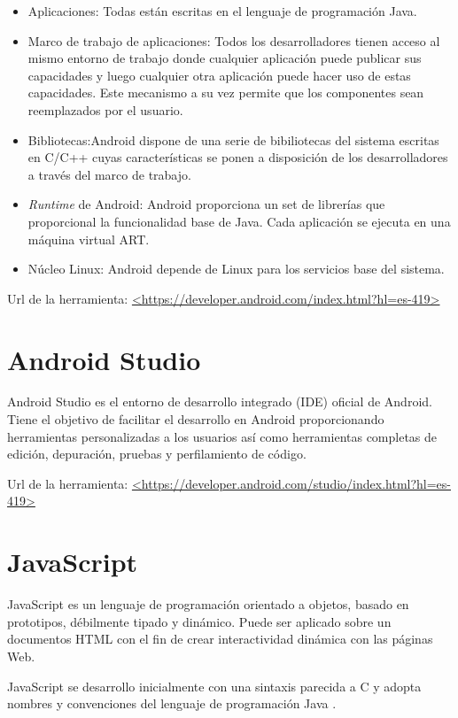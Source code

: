 \begin{itemize}
	\item{Aplicaciones}: Todas están escritas en el lenguaje de programación Java.
	\item{Marco de trabajo de aplicaciones}: Todos los desarrolladores tienen acceso al mismo entorno de trabajo donde cualquier aplicación puede publicar sus capacidades y luego cualquier otra aplicación puede hacer uso de estas capacidades. Este mecanismo a su vez permite que los componentes sean reemplazados por el usuario.
	\item{Bibliotecas}:Android dispone de una serie de bibiliotecas del sistema escritas en C/C++ cuyas características se ponen a disposición de los desarrolladores a través del marco de trabajo.
	\item{\textit{Runtime} de Android}: Android proporciona un set de librerías que proporcional la funcionalidad base de Java. Cada aplicación se ejecuta en una máquina virtual ART.
	\item{Núcleo Linux}: Android depende de Linux para los servicios base del sistema.
\end{itemize}


Url de la herramienta: \url{<https://developer.android.com/index.html?hl=es-419>}

\section{Android Studio}

Android Studio es el entorno de desarrollo integrado (IDE) oficial de Android. Tiene el objetivo de facilitar el desarrollo en Android proporcionando herramientas personalizadas a los usuarios así como herramientas completas de edición, depuración, pruebas y perfilamiento de código.

Url de la herramienta: \url{<https://developer.android.com/studio/index.html?hl=es-419>}

\section{JavaScript}

JavaScript es un lenguaje de programación orientado a objetos, basado en prototipos, débilmente tipado y dinámico. Puede ser aplicado sobre un documentos HTML con el fin de crear interactividad dinámica con las páginas Web.

JavaScript se desarrollo inicialmente con una sintaxis parecida a C y adopta nombres y convenciones del lenguaje de programación Java \cite{wiki:javascript}.

